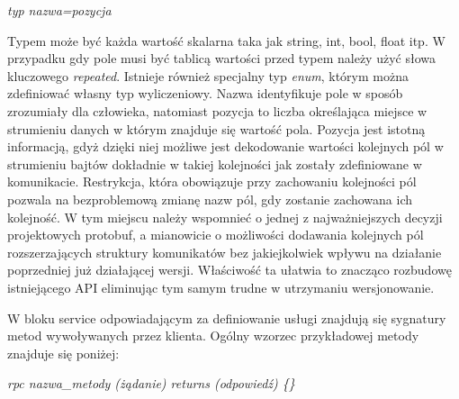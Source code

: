 \centerline{\textit{typ nazwa=pozycja}}
\noindent
Typem może być każda wartość skalarna taka jak string, int, bool, float itp. W przypadku gdy pole musi być tablicą wartości przed typem należy użyć słowa kluczowego \textit{repeated}. Istnieje również specjalny typ \textit{enum}, którym można zdefiniować własny typ wyliczeniowy. Nazwa identyfikuje pole w sposób zrozumiały dla człowieka, natomiast pozycja to liczba określająca miejsce w strumieniu danych w którym znajduje się wartość pola. Pozycja jest istotną informacją, gdyż dzięki niej możliwe jest dekodowanie wartości kolejnych pól w strumieniu bajtów dokładnie w takiej kolejności jak zostały zdefiniowane w komunikacie. Restrykcja, która obowiązuje przy zachowaniu kolejności pól pozwala na bezproblemową zmianę nazw pól, gdy zostanie zachowana ich kolejność. W tym miejscu należy wspomnieć o jednej z najważniejszych decyzji projektowych protobuf, a mianowicie o możliwości dodawania kolejnych pól rozszerzających struktury komunikatów bez jakiejkolwiek wpływu na działanie poprzedniej już działającej wersji. Właściwość ta ułatwia to znacząco rozbudowę istniejącego API eliminując tym samym trudne w utrzymaniu wersjonowanie.
\par W bloku service odpowiadającym za definiowanie usługi znajdują się sygnatury metod wywoływanych przez klienta. Ogólny wzorzec przykładowej metody znajduje się poniżej:

\centerline{\textit{rpc nazwa\_metody (żądanie) returns (odpowiedź) \{\}}}

